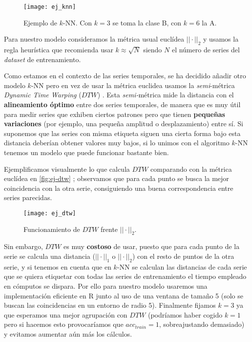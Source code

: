\begin{figure}[htbp]
  \centering
  \texttt{[image: ej\_knn]}
  \caption{Ejemplo de $k$-NN. Con $k=3$ se toma la clase B, con $k=6$ la A.}
  \label{fig:ej-knn}
\end{figure}

Para nuestro modelo consideramos la métrica usual euclídea $||\cdot||_2$ y usamos la regla heurística que recomienda usar $k \approx \sqrt{N}$ siendo $N$ el número de series del \emph{dataset} de entrenamiento.

Como estamos en el contexto de las series temporales, se ha decidido añadir otro modelo $k$-NN pero en vez de usar la métrica euclidea usamos la \emph{semi}-métrica \emph{Dynamic Time Warping} ($DTW$) \cite{berndt1994using}. Esta \emph{semi-}métrica \cite{jain2018semi} mide la distancia con el \textbf{alineamiento óptimo} entre dos series temporales, de manera que es muy útil para medir series que exhiben ciertos patrones pero que tienen \textbf{pequeñas variaciones} (por ejemplo, una pequeña amplitud o desplazamiento) entre sí. Si suponemos que las series con misma etiqueta siguen una cierta forma bajo esta distancia deberían obtener valores muy bajos, si lo unimos con el algoritmo $k$-NN tenemos un modelo que puede funcionar bastante bien.

Ejemplificamos visualmente lo que calcula $DTW$ comparando con la métrica euclídea en \autoref{fig:ej-dtw} \cite{volny2012employing}; observamos que para cada punto se busca la mejor coincidencia con la otra serie, consiguiendo una buena correspondencia entre series parecidas.

\begin{figure}[htbp]
  \centering
  \texttt{[image: ej\_dtw]}
  \caption{Funcionamiento de $DTW$ frente $||\cdot||_2$.}
  \label{fig:ej-dtw}
\end{figure}

Sin embargo, $DTW$ es muy \textbf{costoso} de usar, puesto que para cada punto de la serie se calcula una distancia ($||\cdot||_1$ o $||\cdot||_2$) con el resto de puntos de la otra serie, y si tenemos en cuenta que en $k$-NN se calculan las distancias de cada serie que se quiera etiquetar con todas las series de entrenamiento el tiempo empleado en cómputos se dispara. Por ello para nuestro modelo usaremos una implementación eficiente en R \cite{leodolter2020dtw} junto al uso de una ventana de tamaño 5 (solo se buscan las coincidencias en un entorno de radio 5). Finalmente fijamos $k = 3$ ya que esperamos una mejor agrupación con $DTW$ (podríamos haber cogido $k=1$ pero si hacemos esto provocaríamos que $acc_{train} = 1$, sobreajustando demasiado) y evitamos aumentar aún más los cálculos.


